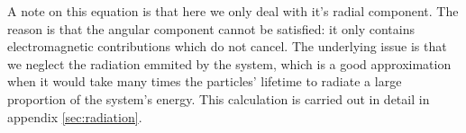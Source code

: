 \documentclass[11pt,a4paper]{article}
\begin{document}
A note on this equation is that here we only deal with it's radial component. The reason is that the angular component cannot be satisfied: it only contains electromagnetic contributions which do not cancel. The underlying issue is that we neglect the radiation emmited by the system, which is a good approximation when it would take many times the particles' lifetime to radiate a large proportion of the system's energy. This calculation is carried out in detail in appendix \ref{sec:radiation}.
\end{document}
